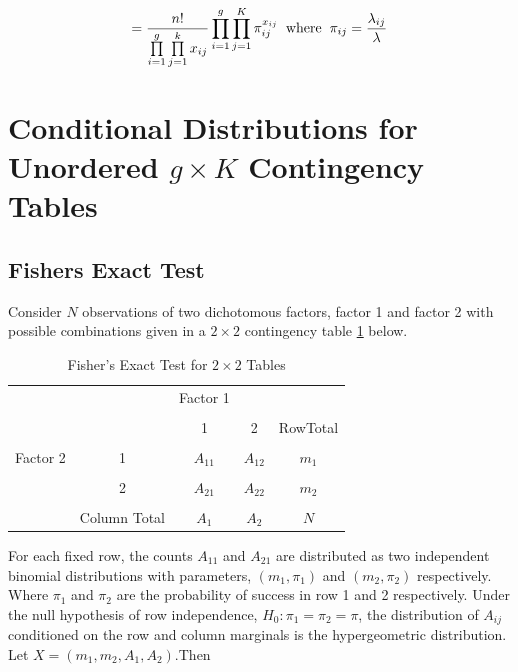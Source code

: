 \documentclass[12pt,oneside]{report}
\theoremstyle{definition}
\theoremstyle{mystyle}
\begin{document}
\begin{equation*}
=\frac{n!}{\prod\limits_{i=1}^{g}\prod\limits_{j=1}^{k}x_{ij}}\displaystyle\prod\limits _{i=1}^{g}\prod\limits _{j=1}^{K}\pi_{ij}^{x_{ij}} \hspace{2mm}\text{where} \hspace{2mm} \pi_{ij}=\frac{\lambda_{ij}}{\lambda}
\end{equation*}


\section{Conditional Distributions for Unordered $g \times K$ Contingency  Tables}	

\subsection{Fishers Exact Test}
Consider $N$ observations of two dichotomous factors, factor 1 and factor 2 with possible combinations given in a $2\times 2$ contingency table \ref{table:fisher} below.
\begin{table}[h!]
	\begin{center}
		\caption{Fisher's Exact Test for $2 \times 2$ Tables}
		\begin{tabular}{c c |c  c |c}
			\hline
			& &Factor 1   &  &  \\ 
			&&&&\\
			& & 1& 2 &RowTotal \\ \hline
			
			\hline
			&&&&\\
			
			Factor 2	&1&$ A_{11}$& $A_{12}$ &$m_{1}$ \\ \cline{3-5}
			&&&&\\
			&2&$ A_{21}$& $A_{22}$ &$m_{2}$ \\ \hline
			&&&&\\
			&Column Total & $A_{1}$ & $A_{2}$ & $N$ \\\hline
			
			
		\end{tabular}
		\label{table:fisher}
	\end{center}
\end{table}

For each fixed row, the counts $ A_{11}$ and $ A_{21}$ are distributed as two  independent binomial distributions  with parameters,  $ (m_{1},\pi_{1}) $ and $ (m_{2},\pi_{2}) $ respectively. Where $\pi_{1}$ and  $\pi_{2}$ are the probability of success in row 1 and 2 respectively. Under the null hypothesis of row independence, $H_{0}:\pi_{1}=\pi_{2}=\pi$, the distribution of  $A_{ij}$ conditioned on  the row and column marginals is the hypergeometric distribution. Let $X=(m_{1},m_{2},A_{1},A_{2})$.Then \\
\end{document}

